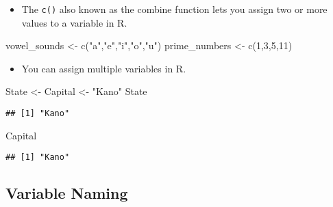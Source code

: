 \documentclass[
]{article}
\newenvironment{Shaded}{\begin{snugshade}}{\end{snugshade}}
\newcommand{\DecValTok}[1]{\textcolor[rgb]{0.00,0.00,0.81}{#1}}
\newcommand{\FunctionTok}[1]{\textcolor[rgb]{0.00,0.00,0.00}{#1}}
\newcommand{\NormalTok}[1]{#1}
\newcommand{\OtherTok}[1]{\textcolor[rgb]{0.56,0.35,0.01}{#1}}
\newcommand{\StringTok}[1]{\textcolor[rgb]{0.31,0.60,0.02}{#1}}
\providecommand{\tightlist}{%
  \setlength{\itemsep}{0pt}\setlength{\parskip}{0pt}}
\begin{document}
\begin{itemize}
\tightlist
\item
  The \texttt{c()} also known as the combine function lets you assign
  two or more values to a variable in R.
\end{itemize}

\begin{Shaded}
\begin{Highlighting}[]
\NormalTok{vowel\_sounds }\OtherTok{\textless{}{-}} \FunctionTok{c}\NormalTok{(}\StringTok{"a"}\NormalTok{,}\StringTok{"e"}\NormalTok{,}\StringTok{"i"}\NormalTok{,}\StringTok{"o"}\NormalTok{,}\StringTok{"u"}\NormalTok{)}
\NormalTok{prime\_numbers }\OtherTok{\textless{}{-}} \FunctionTok{c}\NormalTok{(}\DecValTok{1}\NormalTok{,}\DecValTok{3}\NormalTok{,}\DecValTok{5}\NormalTok{,}\DecValTok{11}\NormalTok{)}
\end{Highlighting}
\end{Shaded}

\begin{itemize}
\tightlist
\item
  You can assign multiple variables in R.
\end{itemize}

\begin{Shaded}
\begin{Highlighting}[]
\NormalTok{State }\OtherTok{\textless{}{-}}\NormalTok{ Capital }\OtherTok{\textless{}{-}} \StringTok{"Kano"}
\NormalTok{State}
\end{Highlighting}
\end{Shaded}

\begin{verbatim}
## [1] "Kano"
\end{verbatim}

\begin{Shaded}
\begin{Highlighting}[]
\NormalTok{Capital}
\end{Highlighting}
\end{Shaded}

\begin{verbatim}
## [1] "Kano"
\end{verbatim}

\hypertarget{variable-naming}{%
\subsection{Variable Naming}\label{variable-naming}}
\end{document}
